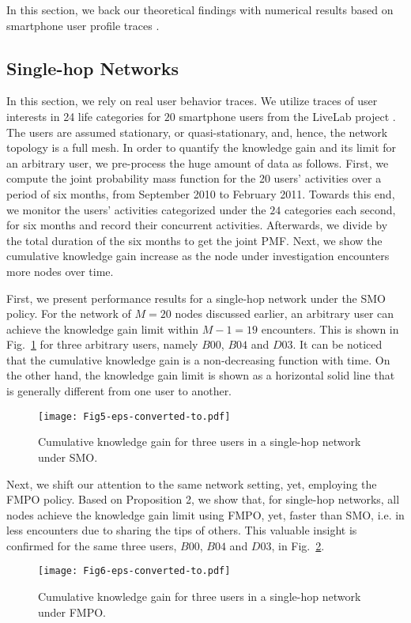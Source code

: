 \documentclass[conference]{IEEEtran}
\theoremstyle{definition}
\begin{document}
In this section, we back our theoretical findings with numerical results based on 
smartphone user profile traces \cite{data}.
\vspace{-0.4 cm}
\subsection{Single-hop Networks}
\vspace{-0.1 cm}
In this section, we rely on real user behavior traces. We utilize traces of user interests in 24 life categories for $20$ smartphone users from the LiveLab project \cite{data}. The users are assumed stationary, or quasi-stationary, and, hence, the network topology is a full mesh. In order to quantify the knowledge gain and its limit for an arbitrary user, we pre-process the huge amount of data as follows. First, we compute the joint probability mass function for the 20 users' activities over a period of six months, from September 2010 to February 2011. Towards this end, we monitor the users' activities categorized under the $24$ categories
each second, for six months and record their concurrent activities. Afterwards, we divide by the total duration of the six months to get the joint PMF. Next, we show the cumulative knowledge gain increase as the node under investigation encounters more nodes over time.


First, we present performance results for a single-hop network under the 
SMO policy. For the network of $M=20$ nodes discussed earlier, an 
arbitrary user can achieve the knowledge gain limit within $M-1=19$ encounters. This is shown in Fig.~\ref{fig:B00_SSHOP)} for three arbitrary users, namely $B00$, $B04$ and $D03$. It can be noticed that the cumulative knowledge gain is a non-decreasing function with time. On the other hand, the knowledge gain limit is shown as a horizontal solid line that is generally different from one user to another.
\begin{figure}[!tp]
\texttt{[image: Fig5-eps-converted-to.pdf]}
\caption{Cumulative knowledge gain for three users in a single-hop network under SMO.}\label{fig:B00_SSHOP)}
\end{figure}


Next, we shift our attention to the same network setting, yet, employing the FMPO policy.
Based on Proposition 2, we show that, for single-hop networks, all nodes achieve the knowledge gain limit using FMPO, yet, faster than SMO, i.e. in less encounters due to sharing the tips of others. This valuable insight is confirmed for the same three users, $B00$, $B04$ and $D03$, in Fig.~\ref{fig:B00_SSHOP(MO)}.
\begin{figure}[!bp]
\centerline{  \texttt{[image: Fig6-eps-converted-to.pdf]}}
\caption{Cumulative knowledge gain for three users in a single-hop network under FMPO.}\label{fig:B00_SSHOP(MO)}
\end{figure}
\vspace{-0.1 cm}
\end{document}
